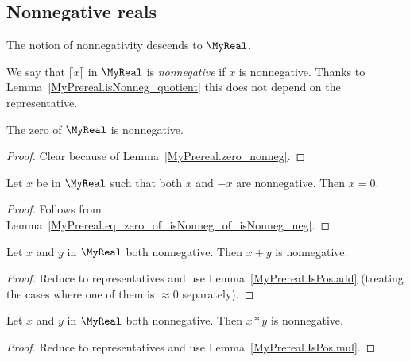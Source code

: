 \subsection{Nonnegative reals}

The notion of nonnegativity descends to $\MyReal$.

\begin{definition}
    \label{MyReal.IsNonneg}
    \leanok
We say that $⟦ x ⟧$ in $\MyReal$ is \emph{nonnegative} if $x$ is nonnegative. Thanks to
Lemma~\ref{MyPrereal.isNonneg_quotient} this does not depend on the representative.
\end{definition}

\begin{lemma}
    \label{MyReal.zero_nonneg}
    \leanok
    The zero of $\MyReal$ is nonnegative.
\end{lemma}
\begin{proof}
    \leanok
    Clear because of Lemma~\ref{MyPrereal.zero_nonneg}.
\end{proof}

\begin{lemma}
    \label{MyReal.eq_zero_of_isNonneg_of_isNonneg_neg}
    \leanok
    Let $x$ be in $\MyReal$ such that both $x$ and $-x$ are nonnegative. Then $x = 0$.
\end{lemma}
\begin{proof}
    \leanok
    Follows from Lemma~\ref{MyPrereal.eq_zero_of_isNonneg_of_isNonneg_neg}.
\end{proof}

\begin{lemma}
    \label{MyReal.IsNonneg.add}
    \leanok
    Let $x$ and $y$ in $\MyReal$ both nonnegative. Then $x + y$ is nonnegative.
\end{lemma}
\begin{proof}
    \leanok
    Reduce to representatives and use Lemma~\ref{MyPrereal.IsPos.add} (treating the cases where one
    of them is $\approx 0$ separately).
\end{proof}

\begin{lemma}
    \label{MyReal.IsNonneg.mul}
    \leanok
    Let $x$ and $y$ in $\MyReal$ both nonnegative. Then $x * y$ is nonnegative.
\end{lemma}
\begin{proof}
    \leanok
    Reduce to representatives and use Lemma~\ref{MyPrereal.IsPos.mul}.
\end{proof}

